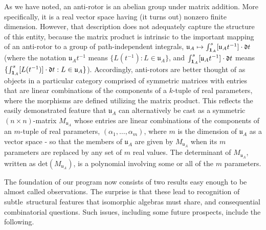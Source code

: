 \documentclass{amsart}
\numberwithin{equation}{section}
\theoremstyle{definition}
\numberwithin{theorem}{section}
\begin{document}
As we have noted, an anti-rotor is an abelian group under matrix addition.  More specifically, it is a real vector space having (it turns out) nonzero finite dimension.  However, that description does not adequately capture the structure of this entity, because the matrix product is intrinsic to the important mapping of an anti-rotor to a group of path-independent integrals, $\mathfrak{u}_A \mapsto \int_{{\bf 1}_A}^s [\mathfrak{u}_At^{-1}]\cdot \mathfrak{d}t$ (where the notation $\mathfrak{u}_A t^{-1}$ means $\{L(t^{-1}): L\in \mathfrak{u}_A\}$, and $\int_{{\bf 1}_A}^s [\mathfrak{u}_At^{-1}]\cdot \mathfrak{d}t$ means $\{\int_{{\bf 1}_A}^s [L(t^{-1})]\cdot \mathfrak{d}t: L\in \mathfrak{u}_A \}$).  Accordingly, anti-rotors are better thought of as objects in a particular category comprised of symmetric matrices with entries that are linear combinations of the components of a $k$-tuple of real parameters, where the morphisms are defined utilizing the matrix product.  This reflects the easily demonstrated feature that $\mathfrak{u}_A$ can alternatively be cast as a symmetric \mbox{$(n\times n)$-matrix} $M_{\mathfrak{u}_A}$ whose entries are linear combinations of the components of an $m$-tuple of real parameters, $(\alpha_1,\dots,\alpha_m)$, where $m$ is the dimension of $\mathfrak{u}_A$ as a vector space - so that the members of $\mathfrak{u}_A$ are given by $M_{\mathfrak{u}_A}$ when its $m$ parameters are replaced by any set of $m$ real values.   The determinant of $M_{\mathfrak{u}_A}$, written as $\text{det}(M_{\mathfrak{u}_A})$, is a polynomial involving some or all of the $m$ parameters.

The foundation of our program now consists of two results easy enough to be almost called observations. The surprise is that these lead to recognition of \mbox{subtle structural} features that isomorphic algebras must share, and consequential combinatorial questions.  Such issues, including some future prospects, include the following.
\end{document}
